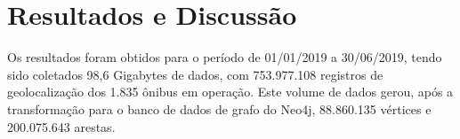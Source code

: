 
\chapter{Resultados e Discussão}\label{cap:resultadosediscussao}



Os resultados foram obtidos para o período de  01/01/2019 a 30/06/2019, tendo sido coletados 98,6 Gigabytes de dados, com 753.977.108 registros de geolocalização dos 1.835 ônibus em operação. Este volume de dados gerou, após a transformação para o banco de dados de grafo do Neo4j, 88.860.135 vértices e 200.075.643 arestas.




